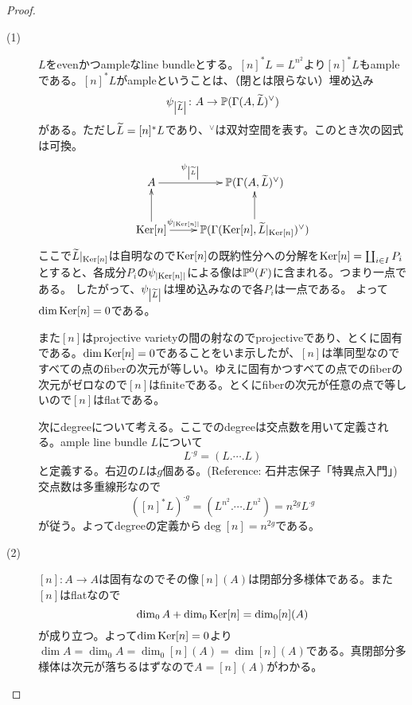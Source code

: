 \begin{proof} ${}$
  \begin{description}
    \item[(1)] $L$をevenかつampleなline bundleとする。$[n]^* L = L^{n^2}$より$[n]^* L$もampleである。$[n]^*L$がampleということは、（閉とは限らない）埋め込み
    \[
    \psi_{\abs{\wt{L}}} \colon A \to \P(\grG (A, \wt{L})^{\vee}  )
    \]
    がある。ただし$\wt{L} = [n]^* L$であり、${}^{\vee}$は双対空間を表す。このとき次の図式は可換。
    \[
    \xymatrix{
    A  \ar[r]^-{\psi_{\abs{\wt{L}}}} & \P(\grG (A, \wt{L})^{\vee}  ) \\
    \Ker [n] \ar[u] \ar[r]^-{\psi_{\abs{ \Ker [n] }  }} & \P(\grG (\Ker [n], \wt{L}|_{\Ker [n] } )^{\vee}  ) \ar[u]
    }
    \]
    ここで$\wt{L}|_{\Ker [n] }$は自明なので$\Ker [n]$の既約性分への分解を$\Ker [n] = \coprod_{i \in I} P_i$とすると、各成分$P_i$の$\psi_{\abs{ \Ker [n] }} $による像は$\P^{0}(F)$に含まれる。つまり一点である。
    したがって、$\psi_{\abs{\wt{L}}}$は埋め込みなので各$P_i$は一点である。
    よって$\dim \Ker [n] =  0$である。

    また$[n]$はprojective varietyの間の射なのでprojectiveであり、とくに固有である。$\dim \Ker [n] =  0$であることをいま示したが、$[n]$は準同型なのですべての点のfiberの次元が等しい。ゆえに固有かつすべての点でのfiberの次元がゼロなので$[n]$はfiniteである。とくにfiberの次元が任意の点で等しいので$[n]$はflatである。

    次にdegreeについて考える。ここでのdegreeは交点数を用いて定義される。ample line bundle $L$について
    \[
    L^{\cdot g} = (L. \cdots . L)
    \]
    と定義する。右辺の$L$は$g$個ある。(Reference: 石井志保子「特異点入門」)交点数は多重線形なので
    \[
    ( [n]^* L)^{\cdot g} = (L^{n^2}. \cdots . L^{n^2}) = n^{2g} L^{\cdot g}
    \]
    が従う。よってdegreeの定義から$\deg [n] = n^{2g}$である。
    \item[(2)] $[n] \colon A \to A$は固有なのでその像$[n](A)$は閉部分多様体である。また$[n]$はflatなので
    \[
    \dim_0 A + \dim_0 \Ker [n] = \dim_0 [n](A)
    \]
    が成り立つ。よって$\dim \Ker [n] =  0$より$\dim A = \dim_0 A = \dim_0 [n](A) = \dim [n](A)$である。真閉部分多様体は次元が落ちるはずなので$A = [n](A)$がわかる。
  \end{description}
\end{proof}


